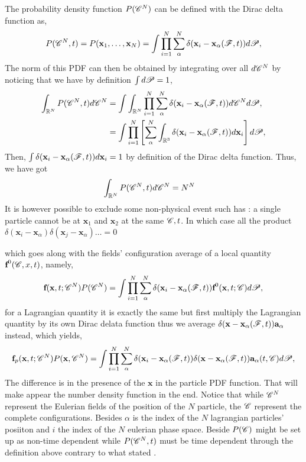 The probability density function $P(\mathscr{C}^N)$ can be defined with the Dirac delta function as, 
\begin{equation*}
    P(\mathscr{C}^N,t)
    =
    P(\textbf{x}_1,\ldots,\textbf{x}_N)
    = \int 
    \prod_{i=1}^{N}\sum_{\alpha}^{N}\delta(\textbf{x}_i - \textbf{x}_\alpha(\mathscr{F},t))
    d\mathscr{P},
\end{equation*}
The norm of this PDF can then be obtained by integrating over all $d\mathscr{C}^N$ by noticing that we have by definition $\int d\mathscr{P} = 1$, 
\begin{align*}
    \int_{\mathbb{R}^N} P(\mathscr{C}^N,t) d\mathscr{C}^N
    &= 
    \int 
    \int_{\mathbb{R}^N}
    \prod_{i=1}^{N}
    \sum_{\alpha}^{N}
    \delta(\textbf{x}_i - \textbf{x}_\alpha(\mathscr{F},t))
    d\mathscr{C}^N
    d\mathscr{P},\\
    &= 
    \int 
    \prod_{i=1}^{N}\left[
    \sum_{\alpha}^{N}
    \int_{\mathbb{R}^3}
    \delta(\textbf{x}_i - \textbf{x}_\alpha(\mathscr{F},t))
    d\textbf{x}_i\right]
    d\mathscr{P},
\end{align*}
Then, $\int \delta(\textbf{x}_i - \textbf{x}_\alpha(\mathscr{F},t)) d\textbf{x}_i= 1$ by definition of the Dirac delta function. 
Thus, we have got 
\begin{align*}
    \int_{\mathbb{R}^N} P(\mathscr{C}^N,t) d\mathscr{C}^N
    &= 
    N^N
\end{align*}
It is however possible to exclude some non-physical event such has : a single particle cannot be at $\textbf{x}_1$ and $\textbf{x}_2$ at the same $\mathscr{C},t$. 
In which case all the product $\delta(\textbf{x}_i - \textbf{x}_\alpha)\delta(\textbf{x}_j - \textbf{x}_\alpha)\ldots  = 0$

which goes along with the fields' configuration average of a local quantity $\textbf{f}^0(\mathscr{C},x,t)$, namely, 
\begin{equation*}
    \textbf{f}(\textbf{x},t;\mathscr{C}^N) P(\mathscr{C}^N)
    = \int 
    \prod_{i=1}^{N}\sum_{\alpha}^{N}\delta(\textbf{x}_i - \textbf{x}_\alpha(\mathscr{F},t)) \textbf{f}^0(\textbf{x},t;\mathscr{C})
    d\mathscr{P},
\end{equation*}
for a Lagrangian quantity it is exactly the same but first multiply the Lagrangian quantity by its own Dirac delata function thus we average $\delta(\textbf{x}-\textbf{x}_\alpha(\mathscr{F},t)) \textbf{a}_\alpha$ instead, which yields, 
\begin{equation*}
    \textbf{f}_p(\textbf{x},t;\mathscr{C}^N) P(\textbf{x},\mathscr{C}^N)
    = \int 
    \prod_{i=1}^{N}\sum_{\alpha}^{N}\delta(\textbf{x}_i - \textbf{x}_\alpha(\mathscr{F},t)) 
    \delta(\textbf{x} - \textbf{x}_\alpha(\mathscr{F},t)) 
    \textbf{a}_\alpha(t,\mathscr{C})
    d\mathscr{P},
\end{equation*}
The difference is in the presence of the $\textbf{x}$ in the particle PDF function. 
That will make appear the number density function in the end. 
Notice that while $\mathscr{C}^N$ represent the Eulerian fields of the position of the $N$ particle, the $\mathscr{C}$ represent the complete configurations.
Besides $\alpha$ is the index of the $N$ lagrangian particles' posiiton and $i$ the index of the $N$ eulerian phase space.
Beside $P(\mathscr{C})$  might be set up as non-time dependent while $P(\mathscr{C}^N,t)$ must be time dependent through the definition above contrary to what stated \citet{zhang1994ensemble}. 

